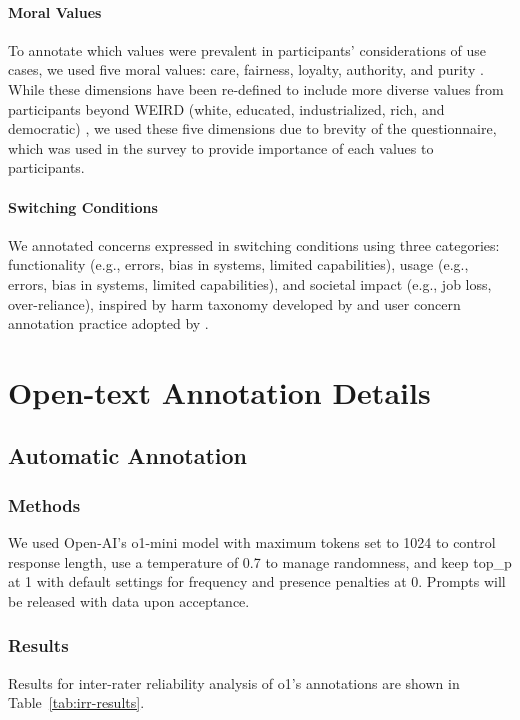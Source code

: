 \paragraph{Moral Values}
To annotate which values were prevalent in participants' considerations of use cases, we used five moral values: care, fairness, loyalty, authority, and purity \citep{graham2011mapping,graham2008moral}. While these dimensions have been re-defined to include more diverse values from participants beyond WEIRD (white, educated, industrialized, rich, and democratic) \citep{atari2023morality}, we used these five dimensions due to brevity of the questionnaire, which was used in the survey to provide importance of each values to participants. 

\paragraph{Switching Conditions}
We annotated concerns expressed in switching conditions using three categories: functionality (e.g., errors, bias in systems, limited capabilities), usage (e.g., errors, bias in systems, limited capabilities), and societal impact (e.g., job loss, over-reliance), inspired by harm taxonomy developed by \citeauthor{solaiman2023evaluating} and user concern annotation practice adopted by \citeauthor{mun2024participaidemocraticsurveyingframework}.

\section{Open-text Annotation Details}
\label{app:open-text-annotation-details}
\subsection{Automatic Annotation}
\subsubsection{Methods}
We used Open-AI's o1-mini model with maximum tokens set to 1024 to control response length, use a temperature of 0.7 to manage randomness, and keep top\_p at 1 with default settings for frequency and presence penalties at 0. Prompts will be released with data upon acceptance. 

\subsubsection{Results}
Results for inter-rater reliability analysis of o1's annotations are shown in Table~\ref{tab:irr-results}.


